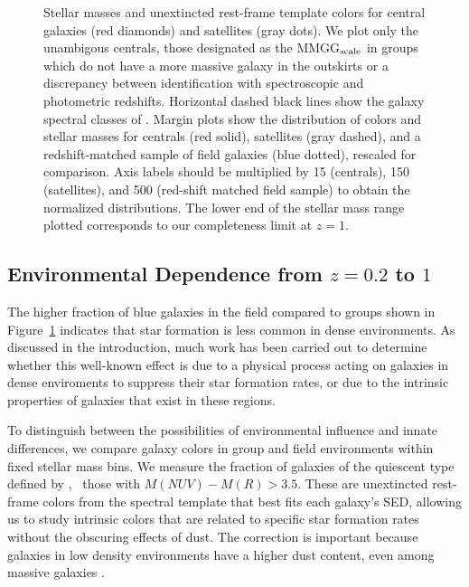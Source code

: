 \begin{figure}
\caption{Stellar masses and unextincted rest-frame template colors for
  central galaxies (red diamonds) and satellites (gray dots). We plot
  only the unambigous centrals, \ie those 
  designated as the MMGG$_{\rm scale}$ in groups which do not have a more
  massive galaxy in the outskirts or a discrepancy between
  identification with spectroscopic and photometric redshifts. Horizontal 
  dashed black lines show the galaxy spectral classes of
  \citet{Ilbert2010}. Margin plots show the distribution of colors and
stellar masses for centrals (red solid), satellites (gray dashed), and
a redshift-matched sample of field galaxies (blue dotted), rescaled
for comparison. Axis labels should be multiplied by 15 (centrals), 150
(satellites), and 500 (red-shift matched field sample)
to obtain the normalized distributions. The lower end of the stellar
mass range plotted corresponds to our completeness limit at $z=1$.}
\label{cat_fig:group_cm}
\end{figure}
 
\subsection{Environmental Dependence from $z=0.2$ to $1$}

The higher fraction of blue galaxies in the field compared to groups
shown in Figure~\ref{cat_fig:group_cm}
indicates that star formation is less common in dense
environments. As discussed in the introduction, much work has been
carried out to determine whether this well-known effect is due to a physical
process acting on galaxies in dense enviroments to suppress their star
formation rates, or due to the intrinsic properties of galaxies that
exist in these regions. 

To distinguish between the possibilities of environmental influence
and innate differences, we compare galaxy colors in group and field
environments within fixed stellar mass bins. We measure the fraction
of galaxies of the quiescent type defined by \citet{Ilbert2010}, \ie\
those with $M(NUV)-M(R)>3.5$. These are unextincted rest-frame colors
from the spectral template that best fits each galaxy's SED, allowing
us to study intrinsic colors that are related to specific star
formation rates without the obscuring effects of dust. The correction
is important because galaxies in low density environments have a higher dust
content, even among massive galaxies \citep{Kauffmann2004}. 

